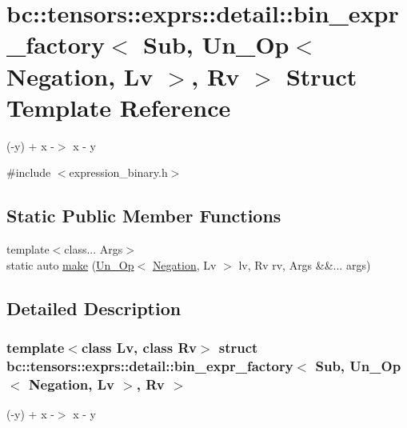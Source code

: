 \hypertarget{structbc_1_1tensors_1_1exprs_1_1detail_1_1bin__expr__factory_3_01Sub_00_01Un__Op_3_01Negation_00_01Lv_01_4_00_01Rv_01_4}{}\section{bc\+:\+:tensors\+:\+:exprs\+:\+:detail\+:\+:bin\+\_\+expr\+\_\+factory$<$ Sub, Un\+\_\+\+Op$<$ Negation, Lv $>$, Rv $>$ Struct Template Reference}
\label{structbc_1_1tensors_1_1exprs_1_1detail_1_1bin__expr__factory_3_01Sub_00_01Un__Op_3_01Negation_00_01Lv_01_4_00_01Rv_01_4}


(-\/y) + x -\/$>$ x -\/ y  




{\ttfamily \#include $<$expression\+\_\+binary.\+h$>$}

\subsection*{Static Public Member Functions}
\begin{DoxyCompactItemize}
\item 
{\footnotesize template$<$class... Args$>$ }\\static auto \hyperlink{structbc_1_1tensors_1_1exprs_1_1detail_1_1bin__expr__factory_3_01Sub_00_01Un__Op_3_01Negation_00_01Lv_01_4_00_01Rv_01_4_aaf27f4570867ee57ce9f2ef8c6e11170}{make} (\hyperlink{structbc_1_1tensors_1_1exprs_1_1Un__Op}{Un\+\_\+\+Op}$<$ \hyperlink{structbc_1_1oper_1_1Negation}{Negation}, Lv $>$ lv, Rv rv, Args \&\&... args)
\end{DoxyCompactItemize}


\subsection{Detailed Description}
\subsubsection*{template$<$class Lv, class Rv$>$\newline
struct bc\+::tensors\+::exprs\+::detail\+::bin\+\_\+expr\+\_\+factory$<$ Sub, Un\+\_\+\+Op$<$ Negation, Lv $>$, Rv $>$}

(-\/y) + x -\/$>$ x -\/ y 

